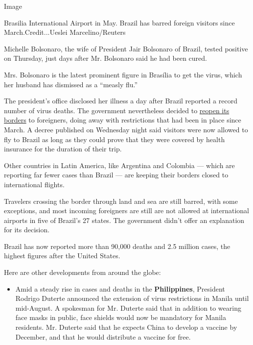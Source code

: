 Image

Brasilia International Airport in May. Brazil has barred foreign
visitors since March.Credit...Ueslei Marcelino/Reuters

Michelle Bolsonaro, the wife of President Jair Bolsonaro of Brazil,
tested positive on Thursday, just days after Mr. Bolsonaro said he had
been cured.

Mrs. Bolsonaro is the latest prominent figure in Brasília to get the
virus, which her husband has dismissed as a ``measly flu.''

The president's office disclosed her illness a day after Brazil reported
a record number of virus deaths. The government nevertheless decided to
\href{http://www.in.gov.br/en/web/dou/-/portaria-cc-pr/mjsp/minfra/ms-n-1-de-29-de-julho-de-2020-269235614}{reopen
its borders} to foreigners, doing away with restrictions that had been
in place since March. A decree published on Wednesday night said
visitors were now allowed to fly to Brazil as long as they could prove
that they were covered by health insurance for the duration of their
trip.

Other countries in Latin America, like Argentina and Colombia --- which
are reporting far fewer cases than Brazil --- are keeping their borders
closed to international flights.

Travelers crossing the border through land and sea are still barred,
with some exceptions, and most incoming foreigners are still are not
allowed at international airports in five of Brazil's 27 states. The
government didn't offer an explanation for its decision.

Brazil has now reported more than 90,000 deaths and 2.5 million cases,
the highest figures after the United States.

Here are other developments from around the globe:

\begin{itemize}
\tightlist
\item
  Amid a steady rise in cases and deaths in the \textbf{Philippines},
  President Rodrigo Duterte announced the extension of virus
  restrictions in Manila until mid-August. A spokesman for Mr. Duterte
  said that in addition to wearing face masks in public, face shields
  would now be mandatory for Manila residents. Mr. Duterte said that he
  expects China to develop a vaccine by December, and that he would
  distribute a vaccine for free.
\end{itemize}

